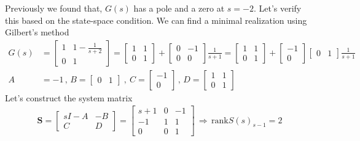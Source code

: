 \documentclass[twoside]{article}
\begin{document}
Previously we found that, $G(s)$ has a pole and a zero at $s = -2$. Let's verify this based on the
state-space condition. We can find a minimal realization using Gilbert's method 
\begin{align*}
     G(s) &= \left[ \begin{array}{cc} 1 & 1 - \frac{1}{s+2}  \\  
	0 & 1  \end{array} \right]
	= \left[ \begin{array}{cc} 1 & 1   \\  
	0 & 1  \end{array} \right] +  \left[ \begin{array}{cc} 0 & -1 \\  
	0 & 0  \end{array} \right] \frac{1}{s+1}
	= \left[ \begin{array}{cc} 1 & 1   \\  
	0 & 1  \end{array} \right] +  \left[ \begin{array}{c} -1 \\ 0 \end{array} \right]   
       \left[ \begin{array}{cc} 0 & 1 \end{array} \right]    \frac{1}{s+1}
       \\
       A &= -1 \, , \, B = \left[ \begin{array}{cc} 0 & 1 \end{array} \right] \ , \ C = \left[ \begin{array}{c} -1 \\ 0 \end{array} \right]
       \, , \, D = \left[ \begin{array}{cc} 1 & 1   \\  
	0 & 1  \end{array} \right]
\end{align*}
%
Let's construct the system matrix 
%
\begin{align*}
\mathbf{S} = \left[ \begin{array}{cc} s I - A & -B \\ C & D \end{array} \right]
= \left[ \begin{array}{ccc} s + 1 & 0 & - 1 \\ -1 & 1 & 1 \\ 0 & 0 & 1 \end{array} \right]
\, \Rightarrow \, \mathrm{rank}S(s)_{s-1} = 2 
\end{align*}
\end{document}

